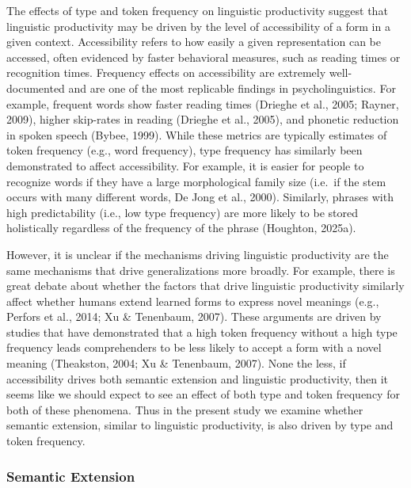 \documentclass[
  letterpaper,
  DIV=11,
  numbers=noendperiod]{scrartcl}
\begin{document}
The effects of type and token frequency on linguistic productivity
suggest that linguistic productivity may be driven by the level of
accessibility of a form in a given context. Accessibility refers to how
easily a given representation can be accessed, often evidenced by faster
behavioral measures, such as reading times or recognition times.
Frequency effects on accessibility are extremely well-documented and are
one of the most replicable findings in psycholinguistics. For example,
frequent words show faster reading times (Drieghe et al., 2005; Rayner,
2009), higher skip-rates in reading (Drieghe et al., 2005), and phonetic
reduction in spoken speech (Bybee, 1999). While these metrics are
typically estimates of token frequency (e.g., word frequency), type
frequency has similarly been demonstrated to affect accessibility. For
example, it is easier for people to recognize words if they have a large
morphological family size (i.e.~if the stem occurs with many different
words, De Jong et al., 2000). Similarly, phrases with high
predictability (i.e., low type frequency) are more likely to be stored
holistically regardless of the frequency of the phrase (Houghton,
2025a).

However, it is unclear if the mechanisms driving linguistic productivity
are the same mechanisms that drive generalizations more broadly. For
example, there is great debate about whether the factors that drive
linguistic productivity similarly affect whether humans extend learned
forms to express novel meanings (e.g., Perfors et al., 2014; Xu \&
Tenenbaum, 2007). These arguments are driven by studies that have
demonstrated that a high token frequency without a high type frequency
leads comprehenders to be less likely to accept a form with a novel
meaning (Theakston, 2004; Xu \& Tenenbaum, 2007). None the less, if
accessibility drives both semantic extension and linguistic
productivity, then it seems like we should expect to see an effect of
both type and token frequency for both of these phenomena. Thus in the
present study we examine whether semantic extension, similar to
linguistic productivity, is also driven by type and token frequency.

\subsubsection{Semantic Extension}\label{semantic-extension}
\end{document}
